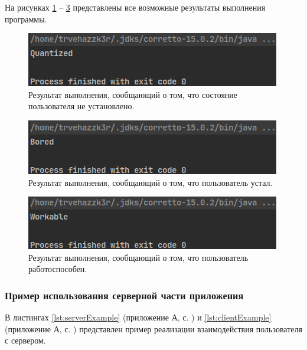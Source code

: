 На рисунках \ref{fig:analyzeExample0} -- \ref{fig:analyzeExample2} представлены все возможные результаты выполнения программы.

\begin{figure}[H]
	\centering
	\includegraphics[width=\textwidth]{img/analyzeExample0.png}
	\caption{Результат выполнения, сообщающий о том, что состояние пользователя не установлено.}
	\label{fig:analyzeExample0}
\end{figure}

\begin{figure}[H]
	\centering
	\includegraphics[width=\textwidth]{img/analyzeExample1.png}
	\caption{Результат выполнения, сообщающий о том, что пользователь устал.}
	\label{fig:analyzeExample1}
\end{figure}

\begin{figure}[H]
	\centering
	\includegraphics[width=\textwidth]{img/analyzeExample2.png}
	\caption{Результат выполнения, сообщающий о том, что пользователь работоспособен.}
	\label{fig:analyzeExample2}
\end{figure}

\subsubsection{Пример использования серверной части приложения}

В листингах \ref{lst:serverExample} (приложение А, с. \pageref{chp:application-a}) и \ref{lst:clientExample} (приложение А, с. \pageref{chp:application-a}) представлен пример реализации взаимодействия пользователя с сервером.

